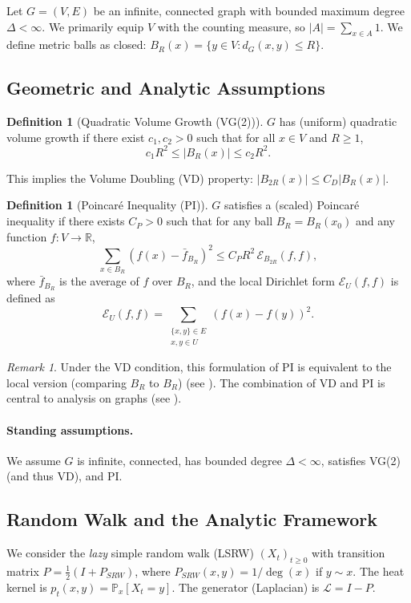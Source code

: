 \documentclass{article}
\numberwithin{equation}{section}
\theoremstyle{definition}
\newtheorem{definition}[theorem]{Definition}
\theoremstyle{remark}
\newtheorem{remark}[theorem]{Remark}
\newcommand{\cE}{\mathcal{E}} %
\newcommand{\LL}{\mathcal{L}} %
\newcommand{\R}{\mathbb{R}}
\newcommand{\Prob}{\mathbb{P}}
\begin{document}
Let $G = (V,E)$ be an infinite, connected graph with bounded maximum degree $\Delta < \infty$. We primarily equip $V$ with the counting measure, so $|A| = \sum_{x \in A} 1$. We define metric balls as closed: $B_R(x) = \{y \in V : d_G(x,y) \leq R\}$.

\subsection{Geometric and Analytic Assumptions}

\begin{definition}[Quadratic Volume Growth (VG(2))]
$G$ has (uniform) quadratic volume growth if there exist $c_1, c_2 > 0$ such that for all $x \in V$ and $R \geq 1$,
\begin{equation}\label{eq:quad}
c_1 R^{2} \leq |B_R(x)| \leq c_2 R^{2}.
\end{equation}
\end{definition}
This implies the Volume Doubling (VD) property: $|B_{2R}(x)| \leq C_D |B_R(x)|$.

\begin{definition}[Poincaré Inequality (PI)]\label{def:PI}
$G$ satisfies a (scaled) Poincaré inequality if there exists $C_P > 0$ such that for any ball $B_R=B_R(x_0)$ and any function $f: V \to \R$,
\[
\sum_{x \in B_R} (f(x) - \bar{f}_{B_R})^2 \leq C_P R^2 \, \cE_{B_{2R}}(f,f),
\]
where $\bar{f}_{B_R}$ is the average of $f$ over $B_R$, and the local Dirichlet form $\cE_U(f,f)$ is defined as
\[
\cE_U(f,f) = \sum_{\substack{\{x,y\} \in E \\ x,y \in U}} (f(x)-f(y))^2.
\]
\end{definition}

\begin{remark}\label{rem:PI_equivalence}
Under the VD condition, this formulation of PI is equivalent to the local version (comparing $B_R$ to $B_R$) (see \cite{HajlaszKoskela00}). The combination of VD and PI is central to analysis on graphs (see \cite{GrigoryanTelcs12}).
\end{remark}

\paragraph{Standing assumptions.} We assume $G$ is infinite, connected, has bounded degree $\Delta < \infty$, satisfies VG(2) (and thus VD), and PI.

\subsection{Random Walk and the Analytic Framework}
We consider the \emph{lazy} simple random walk (LSRW) $(X_t)_{t \geq 0}$ with transition matrix $P = \frac{1}{2}(I + P_{SRW})$, where $P_{SRW}(x,y) = 1/\deg(x)$ if $y \sim x$. The heat kernel is $p_t(x,y) = \Prob_x[X_t = y]$. The generator (Laplacian) is $\LL = I - P$.
\end{document}
